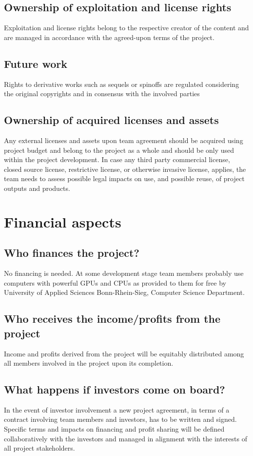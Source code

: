 \documentclass{article}
\begin{document}
\subsection{Ownership of exploitation and license rights}
Exploitation and license rights belong to the respective creator of the content and are managed in accordance with the agreed-upon terms of the project.
\subsection{Future work}
Rights to derivative works such as sequels or spinoffs are regulated considering the original copyrights and in consensus with the involved parties
\subsection{Ownership of acquired licenses and assets}
Any external licenses and assets upon team agreement should be acquired using project budget and belong to the project as a whole and should be only used within the project development.
In case any third party commercial license, closed source license, restrictive license, or otherwise invasive license, applies, the team needs to assess possible legal impacts on use, and possible reuse, of project outputs and products.

\section{Financial aspects}
\subsection{Who finances the project?}
No financing is needed.
At some development stage team members probably use computers with powerful GPUs and CPUs as provided to them for free by University of Applied Sciences Bonn-Rhein-Sieg, Computer Science Department.
\subsection{Who receives the income/profits from the project}
Income and profits derived from the project will be equitably distributed among all members involved in the project upon its completion.
\subsection{What happens if investors come on board?}
In the event of investor involvement a new project agreement, in terms of a contract involving team members and investors, has to be written and signed.
Specific terms and impacts on financing and profit sharing will be defined collaboratively with the investors and managed in alignment with the interests of all project stakeholders.
\end{document}
